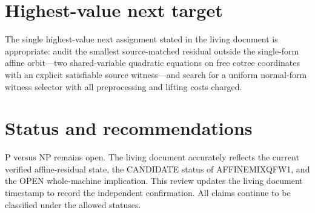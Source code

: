 \documentclass[11pt]{article}
\begin{document}
\section{Highest-value next target}
The single highest-value next assignment stated in the living document is appropriate: audit the smallest source-matched residual outside the single-form affine orbit---two shared-variable quadratic equations on free cotree coordinates with an explicit satisfiable source witness---and search for a uniform normal-form witness selector with all preprocessing and lifting costs charged.

\section{Status and recommendations}
P versus NP remains open. The living document accurately reflects the current verified affine-residual state, the CANDIDATE status of AFFINEMIXQFW1, and the OPEN whole-machine implication. This review updates the living document timestamp to record the independent confirmation. All claims continue to be classified under the allowed statuses.

\end{document}
